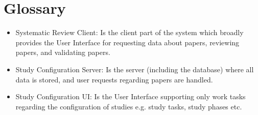 \section{Glossary}

\begin{itemize}

\item Systematic Review Client: Is the client part of the system which broadly provides the User Interface for requesting data about papers, reviewing papers, and validating papers.
\item Study Configuration Server: Is the server (including the database) where all data is stored, and user requests regarding papers are handled.
\item Study Configuration UI: Is the User Interface supporting only work tasks regarding the configuration of studies e.g. study tasks, study phases etc.

\end{itemize}
